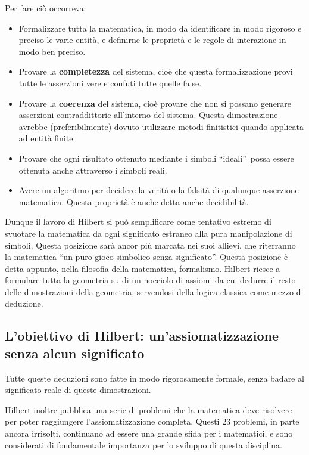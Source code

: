 \documentclass[a4paper,10pt]{article}
\begin{document}
Per fare ciò occorreva:
\begin{itemize}
 \item Formalizzare tutta la matematica, in modo da identificare in modo rigoroso e preciso le varie entità, e definirne le proprietà e le regole di interazione in modo ben preciso.
 \item Provare la \textbf{completezza} del sistema, cioè che questa formalizzazione provi tutte le asserzioni vere e confuti tutte quelle false.
 \item Provare la \textbf{coerenza} del sistema, cioè provare che non si possano generare asserzioni contraddittorie all'interno del sistema. Questa dimostrazione avrebbe (preferibilmente) dovuto utilizzare metodi finitistici quando applicata ad entità finite.
 \item Provare che ogni risultato ottenuto mediante i simboli \textquotedblleft ideali\textquotedblright\ possa essere ottenuta anche attraverso i simboli reali.
 \item Avere un algoritmo per decidere la verità o la falsità di qualunque asserzione matematica. Questa proprietà è anche detta anche decidibilità.
\end{itemize}

Dunque il lavoro di Hilbert si può semplificare come tentativo estremo di svuotare la matematica da ogni significato estraneo alla pura manipolazione di simboli. Questa posizione sarà ancor più marcata nei suoi allievi, che riterranno la matematica “un puro gioco simbolico senza significato”.
Questa posizione è detta appunto, nella filosofia della matematica, formalismo.
Hilbert riesce a formulare tutta la geometria su di un nocciolo di assiomi da cui dedurre il resto delle dimostrazioni della geometria, servendosi della logica classica come mezzo di deduzione.

\subsection{L'obiettivo di Hilbert: un'assiomatizzazione senza alcun significato}
Tutte queste deduzioni sono fatte in modo rigorosamente formale, senza badare al significato reale di queste dimostrazioni.

Hilbert inoltre pubblica una serie di problemi che la matematica deve risolvere per poter raggiungere l'assiomatizzazione completa. Questi 23 problemi, in parte ancora irrisolti, continuano ad essere una grande sfida per i matematici, e sono considerati di fondamentale importanza per lo sviluppo di questa disciplina.
\end{document}
